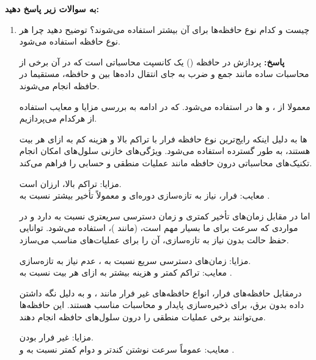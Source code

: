 \documentclass[12pt]{exam}
\newcommand{\class}{\ThesisClass}
\begin{document}

\pagestyle{empty}


\pagestyle{head}
\firstpageheader{}{}{}
\runningheader{صفحه \thepage\ از \numpages}{}{\class}
\runningheadrule

\vspace{0pt}


\begin{questions}
	
	
	\question
\textbf{به سوالات زیر پاسخ دهید:‌ }

\begin{enumerate}
	\item 
	 چیست و کدام نوع حافظه‌ها برای آن بیشتر استفاده می‌شوند؟ توضیح دهید چرا هر نوع حافظه استفاده می‌شود.
	
	\textbf{پاسخ: }
پردازش در حافظه () یک کانسپت محاسباتی است که در آن برخی از محاسبات ساده مانند جمع و ضرب به جای انتقال داده‌ها بین  و حافظه، مستقیما در حافظه انجام می‌شوند.

معمولا از ،  و  ها در  استفاده می‌شود. که در ادامه به بررسی مزایا و معایب استفاده از هرکدام می‌پردازیم.

 ها
به دلیل اینکه رایج‌ترین نوع حافظه فرار با تراکم بالا و هزینه کم به ازای هر بیت هستند، به طور گسترده استفاده می‌شود. ویژگی‌های خازنی سلول‌های  امکان انجام تکنیک‌های محاسباتی درون حافظه مانند عملیات منطقی و حسابی را فراهم می‌کند.

مزایا: تراکم بالا، ارزان است.\\
معایب: فرار، نیاز به تازه‌سازی دوره‌ای و معمولاً تأخیر بیشتر نسبت به .

اما در مقابل   زمان‌های تأخیر کمتری و زمان دسترسی سریعتری نسبت به  دارد و در مواردی که سرعت برای ما بسیار مهم است، (مانند )، استفاده می‌شود. توانایی حفظ حالت بدون نیاز به تازه‌سازی، آن را برای عملیات‌های  مناسب می‌سازد.

مزایا: زمان‌های دسترسی سریع نسبت به ، عدم نیاز به تازه‌سازی.\\
معایب: تراکم کمتر و هزینه بیشتر به ازای هر بیت نسبت به .


درمقابل حافظه‌های فرار، انواع حافظه‌های غیر فرار مانند ،  و  به دلیل نگه داشتن داده بدون برق، برای ذخیره‌سازی پایدار و محاسبات مناسب هستند. این حافظه‌ها می‌توانند برخی عملیات منطقی را درون سلول‌های حافظه انجام دهند.

مزایا: غیر فرار بودن. \\
معایب: عموماً سرعت نوشتن کندتر و دوام کمتر نسبت به  و .
	

\end{enumerate}
\end{questions}
\end{document}

